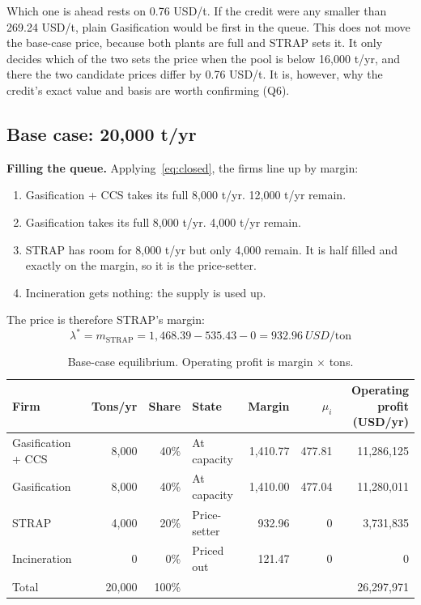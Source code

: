 \documentclass[11pt]{article}
\newcommand{\usd}{USD}
\newcommand{\strap}{\mathrm{STRAP}}
\begin{document}
\begin{cautionbox}[title={The two gasification routes are nearly tied}]
Which one is ahead rests on 0.76 \usd/t. If the credit were any smaller than
269.24 \usd/t, plain Gasification would be first in the queue. This does not move the
base-case price, because both plants are full and STRAP sets it. It only decides
which of the two sets the price when the pool is below 16{,}000 t/yr, and there the
two candidate prices differ by 0.76 \usd/t. It is, however, why the credit's exact
value and basis are worth confirming (Q6).
\end{cautionbox}

\subsection{Base case: 20{,}000 t/yr}
\label{sec:base}

\textbf{Filling the queue.} Applying~\eqref{eq:closed}, the firms line up by margin:
\begin{enumerate}[leftmargin=1.6em,itemsep=0.1em]
  \item Gasification + CCS takes its full 8{,}000 t/yr. 12{,}000 t/yr remain.
  \item Gasification takes its full 8{,}000 t/yr. 4{,}000 t/yr remain.
  \item STRAP has room for 8{,}000 t/yr but only 4{,}000 remain. It is half filled
        and exactly on the margin, so it is the price-setter.
  \item Incineration gets nothing: the supply is used up.
\end{enumerate}
The price is therefore STRAP's margin:
\[
\boxed{\;\lambda^\ast = m_\strap = 1{,}468.39-535.43-0 = 932.96\ \usd/\text{ton}\;}
\]

\begin{table}[h]
\centering
\caption{Base-case equilibrium. Operating profit is margin $\times$ tons.}
\label{tab:base}
\begin{tabular}{@{}lrrlrrr@{}}
\toprule
Firm & Tons/yr & Share & State & Margin & $\mu_i$ & \shortstack{Operating\\profit (\usd/yr)} \\
\midrule
Gasification + CCS & 8{,}000 & 40\% & At capacity     & 1{,}410.77 & 477.81 & 11{,}286{,}125 \\
Gasification       & 8{,}000 & 40\% & At capacity     & 1{,}410.00 & 477.04 & 11{,}280{,}011 \\
STRAP              & 4{,}000 & 20\% & Price-setter    &    932.96  &   0    &  3{,}731{,}835 \\
Incineration       &       0 &  0\% & Priced out      &    121.47  &   0    &            0   \\
\midrule
Total & 20{,}000 & 100\% & & & & 26{,}297{,}971 \\
\bottomrule
\end{tabular}
\end{table}
\end{document}
